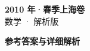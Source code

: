 \documentclass[zihao=-4, a4paper]{ctexart}
\begin{document}
\begin{center}
  {\Large\bfseries 2010 年·春季上海卷}\\[4pt]
  {\large 数学 · 解析版}
\end{center}
\medskip
{}

\clearpage
{}
\begin{center}{\Large\bfseries 参考答案与详细解析}\end{center}
\medskip

\end{document}
